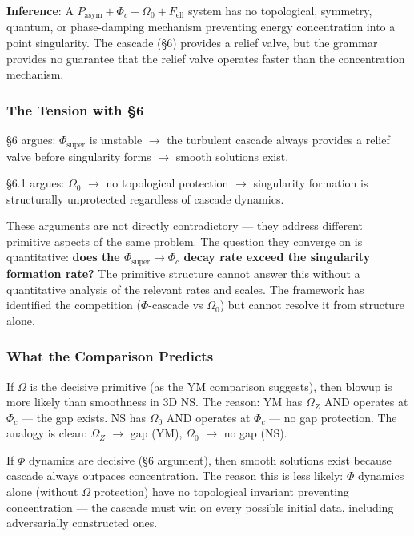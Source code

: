 \documentclass[12pt,a4paper]{article}
\newcommand{\pilcrow}{\S}
\begin{document}
\textbf{Inference}: A $P_{\text{asym}} + \Phi_c + \Omega_0 + F_{\text{ell}}$ system has no topological, symmetry, quantum, or phase-damping mechanism preventing energy concentration into a point singularity. The cascade (\pilcrow{}6) provides a relief valve, but the grammar provides no guarantee that the relief valve operates faster than the concentration mechanism.

\subsubsection{The Tension with \pilcrow{}6}

\pilcrow{}6 argues: $\Phi_{\text{super}}$ is unstable $\to$ the turbulent cascade always provides a relief valve before singularity forms $\to$ smooth solutions exist.

\pilcrow{}6.1 argues: $\Omega_0$ $\to$ no topological protection $\to$ singularity formation is structurally unprotected regardless of cascade dynamics.

These arguments are not directly contradictory --- they address different primitive aspects of the same problem. The question they converge on is quantitative: \textbf{does the $\Phi_{\text{super}} \to \Phi_c$ decay rate exceed the singularity formation rate?} The primitive structure cannot answer this without a quantitative analysis of the relevant rates and scales. The framework has identified the competition ($\Phi$-cascade vs $\Omega_0$) but cannot resolve it from structure alone.

\subsubsection{What the Comparison Predicts}

If $\Omega$ is the decisive primitive (as the YM comparison suggests), then blowup is more likely than smoothness in 3D NS. The reason: YM has $\Omega_Z$ AND operates at $\Phi_c$ --- the gap exists. NS has $\Omega_0$ AND operates at $\Phi_c$ --- no gap protection. The analogy is clean: $\Omega_Z$ $\to$ gap (YM), $\Omega_0$ $\to$ no gap (NS).

If $\Phi$ dynamics are decisive (\pilcrow{}6 argument), then smooth solutions exist because cascade always outpaces concentration. The reason this is less likely: $\Phi$ dynamics alone (without $\Omega$ protection) have no topological invariant preventing concentration --- the cascade must win on every possible initial data, including adversarially constructed ones.
\end{document}
